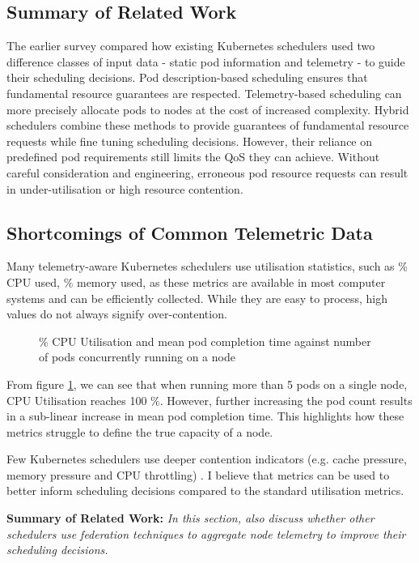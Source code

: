\subsection{Summary of Related Work}
The earlier survey compared how existing Kubernetes schedulers used two
difference classes of input data - static pod information and telemetry - to
guide their scheduling decisions. Pod description-based scheduling ensures that
fundamental resource guarantees are respected. Telemetry-based scheduling can
more precisely allocate pods to nodes at the cost of increased complexity.
Hybrid schedulers combine these methods to provide guarantees of fundamental
resource requests while fine tuning scheduling decisions. However, their
reliance on predefined pod requirements still limits the QoS they can achieve.
Without careful consideration and engineering, erroneous pod resource requests
can result in under-utilisation or high resource contention.



\subsection{Shortcomings of Common Telemetric Data}

Many telemetry-aware Kubernetes schedulers \cite{} use utilisation statistics,
such as \% CPU used, \% memory used, as these metrics are available in most
computer systems and can be efficiently collected. While they are easy to
process, high values do not always signify over-contention.

\begin{figure}
    \caption{\% CPU Utilisation and mean pod completion time against number of
    pods concurrently running on a node}
    \label{contention}
\end{figure}

From figure \ref{contention}, we can see that when running more than 5 pods on a
single node, CPU Utilisation reaches 100 \%. However, further increasing the pod
count results in a sub-linear increase in mean pod completion time. This
highlights how these metrics struggle to define the true capacity of a node.

Few Kubernetes schedulers use deeper contention indicators (e.g. cache pressure,
memory pressure and CPU throttling) \cite{intel-tas, Koordinator}. I believe
that metrics can be used to better inform scheduling decisions compared to the
standard utilisation metrics.

\begin{tcolorbox}[boxsep=0mm,left=2.5mm,right=2.5mm] \textbf{Summary of Related
Work:} {\em In this section, also discuss whether other schedulers use
federation techniques to aggregate node telemetry to improve their scheduling
decisions.} \end{tcolorbox}


